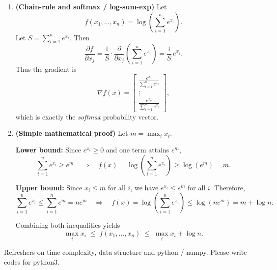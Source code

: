 \documentclass[en,hazy,blue,12pt,normal]{elegantnote}
\begin{document}
\begin{enumerate}[label=\textbf{(\alph*)}, leftmargin=2.2em]
\item \textbf{(Chain-rule and softmax / log-sum-exp)}
Let
\[
f(x_1,\dots,x_n)=\log\left(\sum_{i=1}^n e^{x_i}\right).
\]
Let $S=\sum_{i=1}^n e^{x_i}$. Then
\[
\frac{\partial f}{\partial x_j}
=\frac{1}{S}\cdot \frac{\partial}{\partial x_j}\left(\sum_{i=1}^n e^{x_i}\right)
=\frac{1}{S}\, e^{x_j}.
\]
Thus the gradient is
\[
\nabla f(x)=\begin{bmatrix}
\frac{e^{x_1}}{\sum_{i=1}^n e^{x_i}}\\[4pt]
\vdots\\[2pt]
\frac{e^{x_n}}{\sum_{i=1}^n e^{x_i}}
\end{bmatrix},
\]
which is exactly the \emph{softmax} probability vector.

\item \textbf{(Simple mathematical proof)}
Let $m=\max_i x_i$.

\medskip
\noindent \textbf{Lower bound:} Since $e^{x_i}\ge 0$ and one term attains $e^{m}$,
\[
\sum_{i=1}^n e^{x_i}\ge e^{m}
\quad\Longrightarrow\quad
f(x)=\log\left(\sum_{i=1}^n e^{x_i}\right)\ge \log(e^{m})=m.
\]

\medskip
\noindent \textbf{Upper bound:} Since $x_i\le m$ for all $i$, we have $e^{x_i}\le e^{m}$ for all $i$. Therefore,
\[
\sum_{i=1}^n e^{x_i}\le \sum_{i=1}^n e^{m}=n e^{m}
\quad\Longrightarrow\quad
f(x)=\log\left(\sum_{i=1}^n e^{x_i}\right)\le \log(n e^{m})=m+\log n.
\]

\medskip
\noindent Combining both inequalities yields
\[
\max_i x_i \;\le\; f(x_1,\dots,x_n)\;\le\;\max_i x_i+\log n.
\]

\end{enumerate}

\begin{homework}
     Refreshers on time complexity, data structure and python / numpy. Please write codes for python3.
\end{homework}
\end{document}

